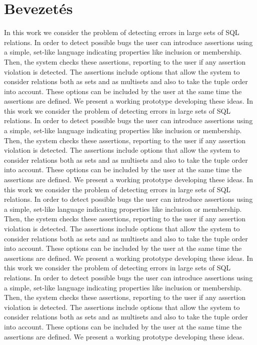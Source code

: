 \documentclass[12pt, a4paper, top=2.5cm]{book}
\begin{document}
\chapter{Bevezetés}
\justify
In this work we consider the problem of detecting errors in large sets of SQL relations. In order to detect possible bugs the user can introduce assertions using a simple, set-like language indicating properties like inclusion or membership. Then, the system checks these assertions, reporting to the user if any assertion violation is detected.
The assertions include options that allow the system to consider relations both as sets and as multisets and also to take the tuple order into account. These options can be included by the user at the same time the assertions are defined. We present a working prototype developing these ideas.
In this work we consider the problem of detecting errors in large sets of SQL relations. In order to detect possible bugs the user can introduce assertions using a simple, set-like language indicating properties like inclusion or membership. Then, the system checks these assertions, reporting to the user if any assertion violation is detected.
The assertions include options that allow the system to consider relations both as sets and as multisets and also to take the tuple order into account. These options can be included by the user at the same time the assertions are defined. We present a working prototype developing these ideas.
In this work we consider the problem of detecting errors in large sets of SQL relations. In order to detect possible bugs the user can introduce assertions using a simple, set-like language indicating properties like inclusion or membership. Then, the system checks these assertions, reporting to the user if any assertion violation is detected.
The assertions include options that allow the system to consider relations both as sets and as multisets and also to take the tuple order into account. These options can be included by the user at the same time the assertions are defined. We present a working prototype developing these ideas.
In this work we consider the problem of detecting errors in large sets of SQL relations. In order to detect possible bugs the user can introduce assertions using a simple, set-like language indicating properties like inclusion or membership. Then, the system checks these assertions, reporting to the user if any assertion violation is detected.
The assertions include options that allow the system to consider relations both as sets and as multisets and also to take the tuple order into account. These options can be included by the user at the same time the assertions are defined. We present a working prototype developing these ideas.
\end{document}
